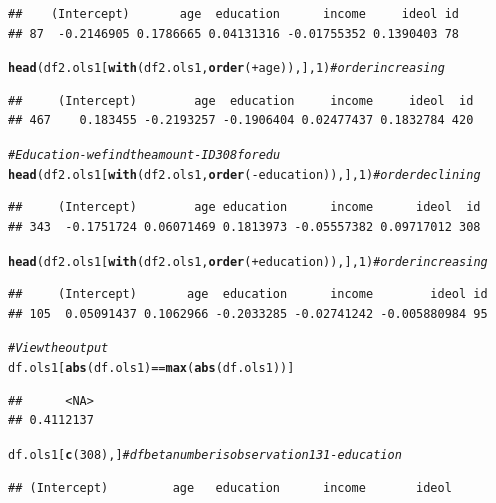 \documentclass[11pt,openany]{book}\usepackage[]{graphicx}\usepackage[]{color}
\makeatletter
\newcommand{\hlnum}[1]{\textcolor[rgb]{0.686,0.059,0.569}{#1}}%
\newcommand{\hlcom}[1]{\textcolor[rgb]{0.678,0.584,0.686}{\textit{#1}}}%
\newcommand{\hlopt}[1]{\textcolor[rgb]{0,0,0}{#1}}%
\newcommand{\hlstd}[1]{\textcolor[rgb]{0.345,0.345,0.345}{#1}}%
\newcommand{\hlkwd}[1]{\textcolor[rgb]{0.737,0.353,0.396}{\textbf{#1}}}%
\newenvironment{kframe}{%
 \def\at@end@of@kframe{}%
 \ifinner\ifhmode%
  \def\at@end@of@kframe{\end{minipage}}%
  \begin{minipage}{\columnwidth}%
 \fi\fi%
 \def\FrameCommand##1{\hskip\@totalleftmargin \hskip-\fboxsep
 \colorbox{shadecolor}{##1}\hskip-\fboxsep
     \hskip-\linewidth \hskip-\@totalleftmargin \hskip\columnwidth}%
 \MakeFramed {\advance\hsize-\width
   \@totalleftmargin\z@ \linewidth\hsize
   \@setminipage}}%
 {\par\unskip\endMakeFramed%
 \at@end@of@kframe}
\newenvironment{knitrout}{}{} %
\renewenvironment{knitrout}{\begin{singlespace}}{\end{singlespace}}
\makeatother
\begin{document}
{\begin{knitrout}
\begin{kframe}
\begin{alltt}
\end{alltt}
\begin{verbatim}
##    (Intercept)       age  education      income     ideol id
## 87  -0.2146905 0.1786665 0.04131316 -0.01755352 0.1390403 78
\end{verbatim}
\begin{alltt}
\hlkwd{head}\hlstd{(df2.ols1[}\hlkwd{with}\hlstd{(df2.ols1,} \hlkwd{order}\hlstd{(}\hlopt{+}\hlstd{age)), ],} \hlnum{1}\hlstd{)}  \hlcom{# order increasing}
\end{alltt}
\begin{verbatim}
##     (Intercept)        age  education     income     ideol  id
## 467    0.183455 -0.2193257 -0.1906404 0.02477437 0.1832784 420
\end{verbatim}
\begin{alltt}
\hlcom{# Education - we find the amount - ID 308 for edu}
\hlkwd{head}\hlstd{(df2.ols1[}\hlkwd{with}\hlstd{(df2.ols1,} \hlkwd{order}\hlstd{(}\hlopt{-}\hlstd{education)), ],} \hlnum{1}\hlstd{)}  \hlcom{# order declining}
\end{alltt}
\begin{verbatim}
##     (Intercept)        age education      income      ideol  id
## 343  -0.1751724 0.06071469 0.1813973 -0.05557382 0.09717012 308
\end{verbatim}
\begin{alltt}
\hlkwd{head}\hlstd{(df2.ols1[}\hlkwd{with}\hlstd{(df2.ols1,} \hlkwd{order}\hlstd{(}\hlopt{+}\hlstd{education)), ],} \hlnum{1}\hlstd{)}  \hlcom{# order increasing}
\end{alltt}
\begin{verbatim}
##     (Intercept)       age  education      income        ideol id
## 105  0.05091437 0.1062966 -0.2033285 -0.02741242 -0.005880984 95
\end{verbatim}
\begin{alltt}
\hlcom{# View the output}
\hlstd{df.ols1[}\hlkwd{abs}\hlstd{(df.ols1)} \hlopt{==} \hlkwd{max}\hlstd{(}\hlkwd{abs}\hlstd{(df.ols1))]}
\end{alltt}
\begin{verbatim}
##      <NA> 
## 0.4112137
\end{verbatim}
\begin{alltt}
\hlstd{df.ols1[}\hlkwd{c}\hlstd{(}\hlnum{308}\hlstd{), ]}  \hlcom{# dfbeta number is observation 131 - education}
\end{alltt}
\begin{verbatim}
## (Intercept)         age   education      income       ideol 

\end{verbatim}
\end{kframe}
\end{knitrout}}
\end{document}
